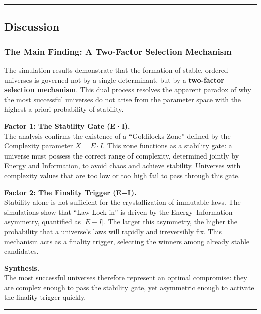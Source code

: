 \begin{center}\rule{0.5\linewidth}{0.5pt}\end{center}

\subsection{Discussion}\label{discussion}

\subsubsection{The Main Finding: A Two-Factor Selection
Mechanism}\label{the-main-finding-a-two-factor-selection-mechanism}

The simulation results demonstrate that the formation of stable, ordered
universes is governed not by a single determinant, but by a
\textbf{two-factor selection mechanism}. This dual process resolves the
apparent paradox of why the most successful universes do not arise from
the parameter space with the highest a priori probability of stability.

\textbf{Factor 1: The Stability Gate (E·I).}\\
The analysis confirms the existence of a ``Goldilocks Zone'' defined by
the Complexity parameter \(X = E \cdot I\). This zone functions as a
stability gate: a universe must possess the correct range of complexity,
determined jointly by Energy and Information, to avoid chaos and achieve
stability. Universes with complexity values that are too low or too high
fail to pass through this gate.

\textbf{Factor 2: The Finality Trigger (\textbar E−I\textbar).}\\
Stability alone is not sufficient for the crystallization of immutable
laws. The simulations show that ``Law Lock-in'' is driven by the
Energy--Information asymmetry, quantified as \(|E - I|\). The larger
this asymmetry, the higher the probability that a universe's laws will
rapidly and irreversibly fix. This mechanism acts as a finality trigger,
selecting the winners among already stable candidates.

\textbf{Synthesis.}\\
The most successful universes therefore represent an optimal compromise:
they are complex enough to pass the stability gate, yet asymmetric
enough to activate the finality trigger quickly.

\begin{center}\rule{0.5\linewidth}{0.5pt}\end{center}

